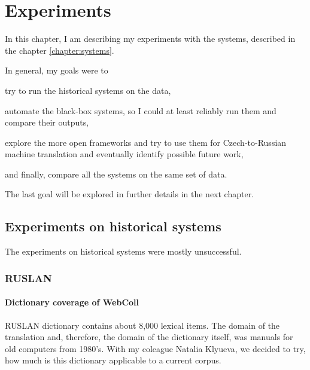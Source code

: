 \chapter{Experiments}
\label{chapter:experiments}
In this chapter, I am describing my experiments with the systems, described in the chapter \ref{chapter:systems}.

In general, my goals were to 
\begin{pitemize}
\item try to run the historical systems on the data,
\item automate the black-box systems, so I could at least reliably run them and compare their outputs,
\item explore the more open frameworks and try to use them for Czech-to-Russian machine translation and eventually identify possible future work,
\item and finally, compare all the systems on the same set of data.
\end{pitemize}

The last goal will be explored in further details in the next chapter.

\section{Experiments on historical systems}
The experiments on historical systems were mostly unsuccessful.

\subsection{RUSLAN}
\subsubsection{Dictionary coverage of WebColl}

RUSLAN dictionary contains about 8,000 lexical items. The domain of the translation and, therefore, the domain of the dictionary itself, was manuals for old computers from 1980's. 
With my coleague Natalia Klyueva, we decided to try, how much is this dictionary applicable to a current corpus.

